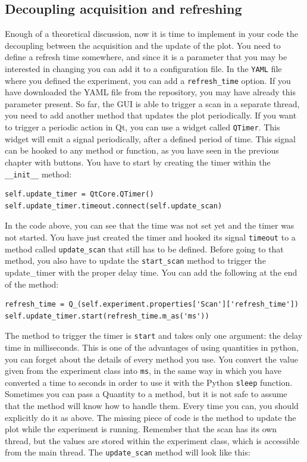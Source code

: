 \subsection{Decoupling acquisition and refreshing}\label{decoupling-acquisition-andrefreshing}
Enough of a theoretical discussion, now it is time to implement in your
code the decoupling between the acquisition and the update of the plot.
You need to define a refresh time somewhere, and since it is a parameter
that you may be interested in changing you can add it to a configuration
file. In the \texttt{YAML} file where you defined the experiment, you
can add a \texttt{refresh_time} option. If you have downloaded the
{YAML} file from the repository, you may have already this parameter
present. So far, the {GUI} is able to trigger a scan in a separate
thread, you need to add another method that updates the plot
periodically. If you want to trigger a periodic action in Qt, you can
use a widget called \texttt{QTimer}. This widget will emit a signal
periodically, after a defined period of time. This signal can be hooked
to any method or function, as you have seen in the previous chapter with
buttons. You have to start by creating the timer within the
\texttt{__init__} method:

\begin{verbatim}
self.update_timer = QtCore.QTimer()
self.update_timer.timeout.connect(self.update_scan)
\end{verbatim}

In the code above, you can see that the time was not set yet and the
timer was not started. You have just created the timer and hooked its
signal \texttt{timeout} to a method called \texttt{update_scan} that
still has to be defined. Before going to that method, you also have to
update the \texttt{start_scan} method to trigger the update\_timer with
the proper delay time. You can add the following at the end of
the method:

\begin{verbatim}
refresh_time = Q_(self.experiment.properties['Scan']['refresh_time'])
self.update_timer.start(refresh_time.m_as('ms'))
\end{verbatim}

The method to trigger the timer is \texttt{start} and takes only one
argument: the delay time in milliseconds. This is one of the advantages
of using quantities in python, you can forget about the details of every
method you use. You convert the value given from the experiment class
into \texttt{ms}, in the same way in which you have converted a time to
seconds in order to use it with the Python \texttt{sleep} function.
Sometimes you can pass a Quantity to a method, but it is not safe to
assume that the method will know how to handle them. Every time you can,
you should explicitly do it as above. The missing piece of code is the
method to update the plot while the experiment is running. Remember that
the scan has its own thread, but the values are stored within the
experiment class, which is accessible from the main thread. The
\texttt{update_scan} method will look like this:

